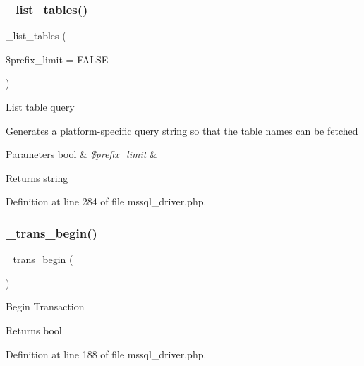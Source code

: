 \subsubsection{\texorpdfstring{\_list\_tables()}{\_list\_tables()}}
{\footnotesize\ttfamily \+\_\+list\+\_\+tables (\begin{DoxyParamCaption}\item[{}]{\$prefix\+\_\+limit = {\ttfamily FALSE} }\end{DoxyParamCaption})\hspace{0.3cm}{\ttfamily [protected]}}

List table query

Generates a platform-\/specific query string so that the table names can be fetched


\begin{DoxyParams}[1]{Parameters}
bool & {\em \$prefix\+\_\+limit} & \\
\hline
\end{DoxyParams}
\begin{DoxyReturn}{Returns}
string 
\end{DoxyReturn}


Definition at line 284 of file mssql\+\_\+driver.\+php.

\mbox{\label{class_c_i___d_b__mssql__driver_ac81ac882c1d54347d810199a15856aac}} 
\subsubsection{\texorpdfstring{\_trans\_begin()}{\_trans\_begin()}}
{\footnotesize\ttfamily \+\_\+trans\+\_\+begin (\begin{DoxyParamCaption}{ }\end{DoxyParamCaption})\hspace{0.3cm}{\ttfamily [protected]}}

Begin Transaction

\begin{DoxyReturn}{Returns}
bool 
\end{DoxyReturn}


Definition at line 188 of file mssql\+\_\+driver.\+php.

\mbox{\label{class_c_i___d_b__mssql__driver_a6fe7f373e0b11cfae23a5f41c0b35dda}} 
